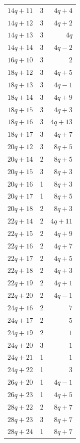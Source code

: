 \begin{longtable}{rrr}
$14q+11$ & 3 & $4q+4$\\
$14q+12$ & 3 & $4q+2$\\
$14q+13$ & 3 & $4q$\\
$14q+14$ & 3 & $4q-2$\\
$16q+10$ & 3 & $2$\\
$18q+12$ & 3 & $4q+5$\\
$18q+13$ & 3 & $4q-1$\\
$18q+14$ & 3 & $4q+9$\\
$18q+15$ & 3 & $4q+3$\\
$18q+16$ & 3 & $4q+13$\\
$18q+17$ & 3 & $4q+7$\\
$20q+12$ & 3 & $8q+5$\\
$20q+14$ & 2 & $8q+5$\\
$20q+15$ & 3 & $8q+3$\\
$20q+16$ & 1 & $8q+3$\\
$20q+17$ & 1 & $8q+5$\\
$20q+18$ & 2 & $8q+3$\\
$22q+14$ & 2 & $4q+11$\\
$22q+15$ & 2 & $4q+9$\\
$22q+16$ & 2 & $4q+7$\\
$22q+17$ & 2 & $4q+5$\\
$22q+18$ & 2 & $4q+3$\\
$22q+19$ & 2 & $4q+1$\\
$22q+20$ & 2 & $4q-1$\\
$24q+16$ & 2 & $7$\\
$24q+17$ & 2 & $5$\\
$24q+19$ & 2 & $1$\\
$24q+20$ & 3 & $1$\\
$24q+21$ & 1 & $1$\\
$24q+22$ & 1 & $3$\\
$26q+20$ & 1 & $4q-1$\\
$26q+23$ & 1 & $4q+5$\\
$28q+22$ & 2 & $8q+7$\\
$28q+23$ & 3 & $8q+7$\\
$28q+24$ & 1 & $8q+7$\\
\end{longtable}
\endgroup

